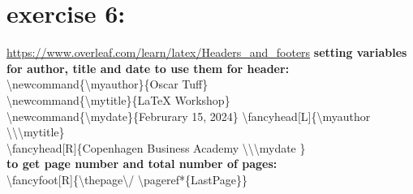 \section{exercise 6:}
\url{https://www.overleaf.com/learn/latex/Headers_and_footers}
\textbf{setting variables for author, title and date to use them for header:}
\\
\textbackslash newcommand\{\textbackslash myauthor\}\{Oscar Tuff\}
\\
\textbackslash newcommand\{\textbackslash mytitle\}\{LaTeX Workshop\}
\\
\textbackslash newcommand\{\textbackslash mydate\}\{Februrary 15, 2024\}
\textbackslash fancyhead[L]\{\textbackslash myauthor  \textbackslash \textbackslash  \textbackslash mytitle\}
\\
\textbackslash fancyhead[R]\{Copenhagen Business Academy  \textbackslash \textbackslash  \textbackslash mydate \}
\\
\textbf{to get page number and total number of pages:}
\\
\textbackslash fancyfoot[R]\{\textbackslash thepage\textbackslash  / \textbackslash pageref*\{LastPage\}\}
